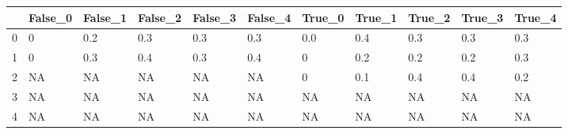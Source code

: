 \begin{tabular}{lllllllllll}
\toprule
{} & False\_0 & False\_1 & False\_2 & False\_3 & False\_4 & True\_0 & True\_1 & True\_2 & True\_3 & True\_4 \\ \hline
\midrule
0 &       0 &     0.2 &     0.3 &     0.3 &     0.3 &    0.0 &    0.4 &    0.3 &    0.3 &    0.3 \\ \hline
1 &       0 &     0.3 &     0.4 &     0.3 &     0.4 &      0 &    0.2 &    0.2 &    0.2 &    0.3 \\ \hline
2 &      NA &      NA &      NA &      NA &      NA &      0 &    0.1 &    0.4 &    0.4 &    0.2 \\ \hline
3 &      NA &      NA &      NA &      NA &      NA &     NA &     NA &     NA &     NA &     NA \\ \hline
4 &      NA &      NA &      NA &      NA &      NA &     NA &     NA &     NA &     NA &     NA \\ \hline
\bottomrule
\end{tabular}
